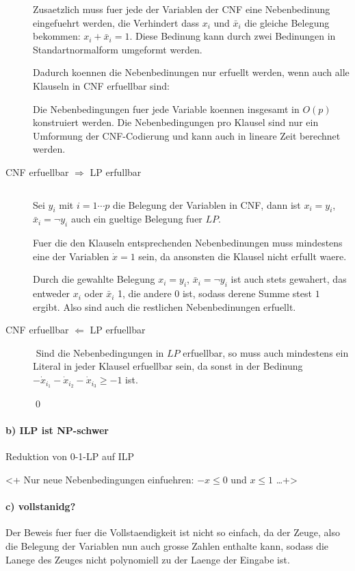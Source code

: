 \begin{description}
Zusaetzlich muss fuer jede der Variablen der CNF eine Nebenbedinung eingefuehrt werden,
die Verhindert dass $x_i$ und $\bar x_i$ die gleiche Belegung bekommen:
$x_i + \bar x_i = 1$. Diese Bedinung kann durch zwei Bedinungen in Standartnormalform umgeformt werden.

Dadurch koennen die Nebenbedinungen nur erfuellt werden, wenn auch alle Klauseln in CNF erfuellbar sind:

Die Nebenbedingungen fuer jede Variable koennen insgesamt in $O(p)$ konstruiert werden.
Die Nebenbedingungen pro Klausel sind nur ein Umformung der CNF-Codierung und kann
auch in lineare Zeit berechnet werden.

\item[CNF erfuellbar $\Rightarrow$ LP erfullbar] $ $

Sei $y_i$ mit $i=1 \cdots p$ die Belegung der Variablen in CNF,
dann ist $x_i = y_i$, $\bar x_i = \lnot y_i$ auch ein gueltige Belegung fuer $LP$.

Fuer die den Klauseln entsprechenden Nebenbedinungen muss mindestens eine
der Variablen $\dot x = 1$ sein, da ansonsten die Klausel nicht erfullt waere.

Durch die gewahlte Belegung  $x_i = y_i$, $\bar x_i = \lnot y_i$ ist auch stets gewahert,
das entweder $x_i$ oder $\bar x_i$ 1, die andere 0 ist, sodass derene Summe stest $1$ ergibt.
Also sind auch die restlichen Nebenbedinungen erfuellt.

\item[CNF erfuellbar $\Leftarrow$ LP erfuellbar] $ $
Sind die Nebenbedingungen in $LP$ erfuellbar, so muss auch mindestens ein Literal in jeder 
Klausel erfuellbar sein, da sonst in der Bedinung $-\dot x_{i_1} - \dot x_{i_2} - \dot x_{i_3}\geq -1$
ist.

\qed

\end{description}





\paragraph{b) ILP ist NP-schwer} Reduktion von 0-1-LP auf ILP

<+ Nur neue Nebenbedingungen einfuehren: $-x \leq 0$ und $x \leq 1$ \ldots +>

\paragraph{c) vollstanidg?} 
Der Beweis fuer fuer die Vollstaendigkeit ist nicht so einfach, 
da der Zeuge, also die Belegung der Variablen nun auch grosse Zahlen enthalte
kann, sodass die Lanege des Zeuges nicht polynomiell zu der Laenge der 
Eingabe ist.

